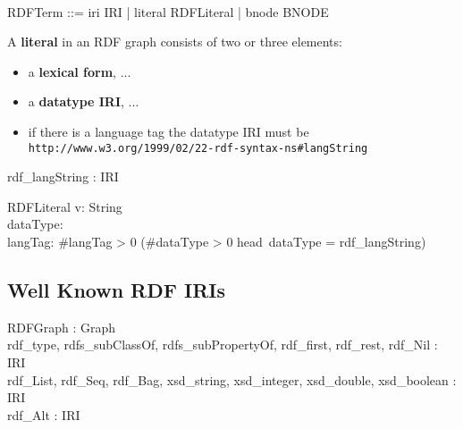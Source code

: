 \documentclass{article}
\def\uri#1{{\tt #1}}
\begin{document}
\begin{zed}
 \\
RDFTerm ::= iri \ldata IRI \rdata | literal \ldata RDFLiteral \rdata | bnode \ldata BNODE \rdata \\
\end{zed}

\noindent
A \textbf{literal} in an RDF graph consists of two or three elements:
\begin{itemize}
\item a \textbf{lexical form}, ...
\item a \textbf{datatype IRI}, ...
\item if there is a language tag the datatype IRI must be \\
\uri{http://www.w3.org/1999/02/22-rdf-syntax-ns\#langString}
\end{itemize}

\begin{zed}
[LANGTAG] 
\end{zed}
\begin{axdef}
rdf\_langString : IRI
\end{axdef}

\begin{schema}{RDFLiteral}
   v: String \\
   dataType: \optional[IRI] \\
   langTag: \optional[LANGTAG]
\where
  \#langTag > 0 \iff (\#dataType > 0 \land head~dataType = rdf\_langString)
\end{schema}


\subsection{Well Known RDF IRIs}

\begin{axdef}
  RDFGraph : Graph \\
  rdf\_type, rdfs\_subClassOf, rdfs\_subPropertyOf, rdf\_first, rdf\_rest, rdf\_Nil : IRI \\
  rdf\_List, rdf\_Seq, rdf\_Bag, xsd\_string, xsd\_integer, xsd\_double, xsd\_boolean : IRI \\
  rdf\_Alt : IRI 
\end{axdef}
\end{document}
